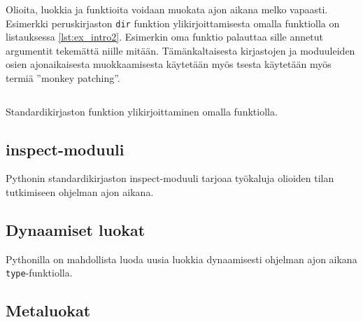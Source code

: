\documentclass[finnish]{tktltiki2}
\theoremstyle{definition}
\theoremstyle{remark}
\begin{document}
Olioita, luokkia ja funktioita voidaan muokata ajon aikana melko vapaasti. Esimerkki peruskirjaston \verb|dir| funktion ylikirjoittamisesta omalla funktiolla on listauksessa \ref{lst:ex_intro2}. Esimerkin oma funktio palauttaa sille annetut argumentit tekemättä niille mitään. Tämänkaltaisesta kirjastojen ja moduuleiden osien ajonaikaisesta muokkaamisesta käytetään myös tsesta käytetään myös termiä ''monkey patching''.

\begin{listing}
    \inputminted[linenos]{python}{code/introspektio2.py}
    \caption{Standardikirjaston funktion ylikirjoittaminen omalla funktiolla.}
    \label{lst:ex_intro2}
\end{listing}


\subsection{inspect-moduuli}

Pythonin standardikirjaston inspect-moduuli tarjoaa työkaluja olioiden tilan tutkimiseen ohjelman ajon aikana. 

\subsection{Dynaamiset luokat}

Pythonilla on mahdollista luoda uusia luokkia dynaamisesti ohjelman ajon aikana \verb|type|-funktiolla.


\subsection{Metaluokat}




\end{document}

